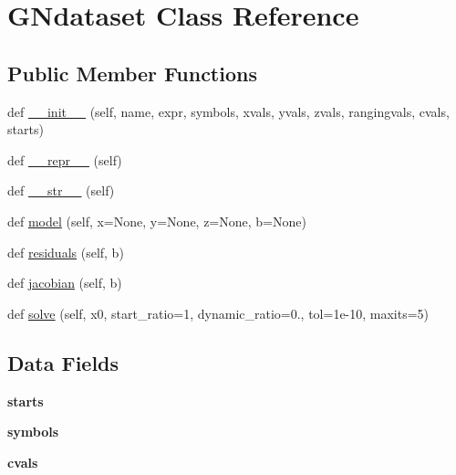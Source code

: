 \hypertarget{class_gauss_newton_1_1_g_ndataset}{}\section{G\+Ndataset Class Reference}
\label{class_gauss_newton_1_1_g_ndataset}
\subsection*{Public Member Functions}
\begin{DoxyCompactItemize}
\item 
def \mbox{\hyperlink{class_gauss_newton_1_1_g_ndataset_a968de9ac0e395fe6cfdec7fb16a99b3d}{\+\_\+\+\_\+init\+\_\+\+\_\+}} (self, name, expr, symbols, xvals, yvals, zvals, rangingvals, cvals, starts)
\item 
def \mbox{\hyperlink{class_gauss_newton_1_1_g_ndataset_a9a47563093dfc5ba12274b66e368920c}{\+\_\+\+\_\+repr\+\_\+\+\_\+}} (self)
\item 
def \mbox{\hyperlink{class_gauss_newton_1_1_g_ndataset_a23e8041ce1015febe4fdace3225714f9}{\+\_\+\+\_\+str\+\_\+\+\_\+}} (self)
\item 
def \mbox{\hyperlink{class_gauss_newton_1_1_g_ndataset_ac19fa38fbddb146e4803a28f9a0ddcf2}{model}} (self, x=None, y=None, z=None, b=None)
\item 
def \mbox{\hyperlink{class_gauss_newton_1_1_g_ndataset_a5127ea775c557e887e1ef8172a5f5d39}{residuals}} (self, b)
\item 
def \mbox{\hyperlink{class_gauss_newton_1_1_g_ndataset_a7482d05a91eb0abc6797b33e1bb3d955}{jacobian}} (self, b)
\item 
def \mbox{\hyperlink{class_gauss_newton_1_1_g_ndataset_a761f3746fb20b84ec70f2939300ca517}{solve}} (self, x0, start\+\_\+ratio=1, dynamic\+\_\+ratio=0., tol=1e-\/10, maxits=5)
\end{DoxyCompactItemize}
\subsection*{Data Fields}
\begin{DoxyCompactItemize}
\item 
\mbox{\label{class_gauss_newton_1_1_g_ndataset_a97b40a45a893919b7c3d281b502b4d37}} 
{\bfseries starts}
\item 
\mbox{\label{class_gauss_newton_1_1_g_ndataset_a591fb19f856c8faff2c302734ad80cc0}} 
{\bfseries symbols}
\item 
\mbox{\label{class_gauss_newton_1_1_g_ndataset_aa03e4b7a2a776a396d9b717346c30025}} 
{\bfseries cvals}
\end{DoxyCompactItemize}


